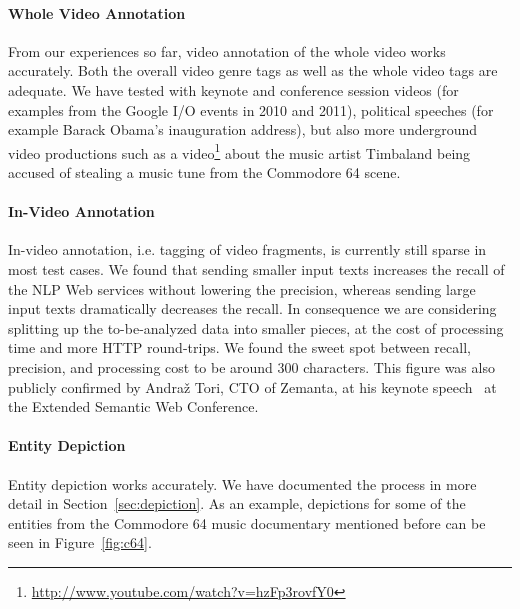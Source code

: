 \documentclass[12pt]{article}
\begin{document}
\paragraph{Whole Video Annotation}
From our experiences so far, video annotation of the whole video works accurately. Both the overall video genre tags as well as the whole video tags are adequate. We have tested with keynote and conference session videos (for examples from the Google I/O events in 2010 and 2011), political speeches (for example Barack Obama's inauguration address), but also more underground video productions such as a video\footnote{\url{http://www.youtube.com/watch?v=hzFp3rovfY0}} about the music artist Timbaland being accused of stealing a music tune from the Commodore 64 scene.

\paragraph{In-Video Annotation}
In-video annotation, i.e. tagging of video fragments, is currently still sparse in most test cases. We found that sending smaller input texts increases the recall of the NLP Web services without lowering the precision, whereas sending large input texts dramatically decreases the recall. In consequence we are considering splitting up the to-be-analyzed data into smaller pieces, at the cost of processing time and more HTTP round-trips. We found the sweet spot between recall, precision, and processing cost to be around 300 characters. This figure was also publicly confirmed by Andra\v{z} Tori, CTO of Zemanta, at his keynote speech~\cite{andraz} at the Extended Semantic Web Conference.

\paragraph{Entity Depiction}
Entity depiction works accurately. We have documented the process in more detail in Section~\ref{sec:depiction}. As an example, depictions for some of the entities from the Commodore 64 music documentary mentioned before can be seen in Figure~\ref{fig:c64}.
\end{document}
